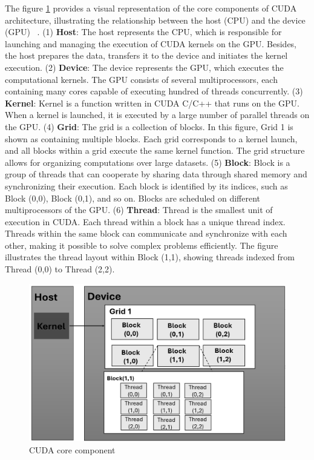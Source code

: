 \documentclass[PhD]{PHlab-thesis}
\begin{document}
The figure \ref{fig:core component} provides a visual representation of the core components of CUDA architecture, illustrating the relationship between the host (CPU) and the device (GPU) ~\cite{CUDA}. (1) \textbf{Host}: The host represents the CPU, which is responsible for launching and managing the execution of CUDA kernels on the GPU. Besides, the host prepares the data, transfers it to the device and initiates the kernel execution. (2) \textbf{Device}: The device represents the GPU, which executes the computational kernels. The GPU consists of several multiprocessors, each containing many cores capable of executing hundred of threads concurrently. (3) \textbf{Kernel}: Kernel is a function written in CUDA C/C++ that runs on the GPU. When a kernel is launched, it is executed by a large number of parallel threads on the GPU. (4) \textbf{Grid}: The grid is a collection of blocks. In this figure, Grid 1 is shown as containing multiple blocks. Each grid corresponds to a kernel launch, and all blocks within a grid execute the same kernel function. The grid structure allows for organizing computations over large datasets. (5) \textbf{Block}: Block is a group of threads that can cooperate by sharing data through shared memory and synchronizing their execution. Each block is identified by its indices, such as Block (0,0), Block (0,1), and so on. Blocks are scheduled on different multiprocessors of the GPU. (6) \textbf{Thread}: Thread is the smallest unit of execution in CUDA. Each thread within a block has a unique thread index. Threads within the same block can communicate and synchronize with each other, making it possible to solve complex problems efficiently. The figure illustrates the thread layout within Block (1,1), showing threads indexed from Thread (0,0) to Thread (2,2).

\begin{figure}[h]
    \centering
    \includegraphics[width=1\linewidth]{figure/grid_block_thread.png}
    \caption{CUDA core component}
    \label{fig:core component}
\end{figure}
\end{document}
